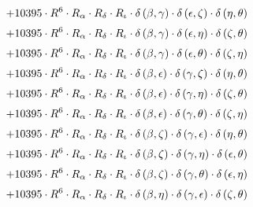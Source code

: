 \begin{subequations}
\begin{gather}
 \\[0.2em] \notag 		 + 10395 \cdot R^{6} \cdot R_{\alpha{}} \cdot R_{\delta{}} \cdot R_{\iota{}} \cdot \delta{}\left(\beta{}, \gamma{}\right) \cdot \delta{}\left(\epsilon{}, \zeta{}\right) \cdot \delta{}\left(\eta{}, \theta{}\right) 
 \\[0.2em] \notag 		 + 10395 \cdot R^{6} \cdot R_{\alpha{}} \cdot R_{\delta{}} \cdot R_{\iota{}} \cdot \delta{}\left(\beta{}, \gamma{}\right) \cdot \delta{}\left(\epsilon{}, \eta{}\right) \cdot \delta{}\left(\zeta{}, \theta{}\right) 
 \\[0.2em] \notag 		 + 10395 \cdot R^{6} \cdot R_{\alpha{}} \cdot R_{\delta{}} \cdot R_{\iota{}} \cdot \delta{}\left(\beta{}, \gamma{}\right) \cdot \delta{}\left(\epsilon{}, \theta{}\right) \cdot \delta{}\left(\zeta{}, \eta{}\right) 
 \\[0.2em] \notag 		 + 10395 \cdot R^{6} \cdot R_{\alpha{}} \cdot R_{\delta{}} \cdot R_{\iota{}} \cdot \delta{}\left(\beta{}, \epsilon{}\right) \cdot \delta{}\left(\gamma{}, \zeta{}\right) \cdot \delta{}\left(\eta{}, \theta{}\right) 
 \\[0.2em] \notag 		 + 10395 \cdot R^{6} \cdot R_{\alpha{}} \cdot R_{\delta{}} \cdot R_{\iota{}} \cdot \delta{}\left(\beta{}, \epsilon{}\right) \cdot \delta{}\left(\gamma{}, \eta{}\right) \cdot \delta{}\left(\zeta{}, \theta{}\right) 
 \\[0.2em] \notag 		 + 10395 \cdot R^{6} \cdot R_{\alpha{}} \cdot R_{\delta{}} \cdot R_{\iota{}} \cdot \delta{}\left(\beta{}, \epsilon{}\right) \cdot \delta{}\left(\gamma{}, \theta{}\right) \cdot \delta{}\left(\zeta{}, \eta{}\right) 
 \\[0.2em] \notag 		 + 10395 \cdot R^{6} \cdot R_{\alpha{}} \cdot R_{\delta{}} \cdot R_{\iota{}} \cdot \delta{}\left(\beta{}, \zeta{}\right) \cdot \delta{}\left(\gamma{}, \epsilon{}\right) \cdot \delta{}\left(\eta{}, \theta{}\right) 
 \\[0.2em] \notag 		 + 10395 \cdot R^{6} \cdot R_{\alpha{}} \cdot R_{\delta{}} \cdot R_{\iota{}} \cdot \delta{}\left(\beta{}, \zeta{}\right) \cdot \delta{}\left(\gamma{}, \eta{}\right) \cdot \delta{}\left(\epsilon{}, \theta{}\right) 
 \\[0.2em] \notag 		 + 10395 \cdot R^{6} \cdot R_{\alpha{}} \cdot R_{\delta{}} \cdot R_{\iota{}} \cdot \delta{}\left(\beta{}, \zeta{}\right) \cdot \delta{}\left(\gamma{}, \theta{}\right) \cdot \delta{}\left(\epsilon{}, \eta{}\right) 
 \\[0.2em] \notag 		 + 10395 \cdot R^{6} \cdot R_{\alpha{}} \cdot R_{\delta{}} \cdot R_{\iota{}} \cdot \delta{}\left(\beta{}, \eta{}\right) \cdot \delta{}\left(\gamma{}, \epsilon{}\right) \cdot \delta{}\left(\zeta{}, \theta{}\right) 

\end{gather}
\end{subequations}
